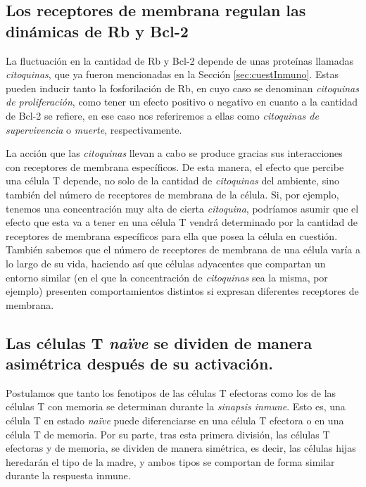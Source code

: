 \subsection{Los receptores de membrana regulan las dinámicas de Rb y Bcl-2}
\label{sub:hip_recep}

La fluctuación en la cantidad de Rb y Bcl-2 depende de unas proteínas llamadas \textit{citoquinas}, que ya fueron mencionadas en la Sección \ref{sec:cuestInmuno}. Estas pueden inducir tanto la fosforilación de Rb, en cuyo caso se denominan \textit{citoquinas de proliferación}, como tener un efecto positivo o negativo en cuanto a la cantidad de Bcl-2 se refiere, en ese caso nos referiremos a ellas como \textit{citoquinas de supervivencia} o \textit{muerte}, respectivamente.

La acción que las \textit{citoquinas} llevan a cabo se produce gracias sus interacciones con receptores de membrana específicos. De esta manera, el efecto que percibe una célula T depende, no solo de la cantidad de \textit{citoquinas} del ambiente, sino también del número de receptores de membrana de la célula. Si, por ejemplo, tenemos una concentración muy alta de cierta \textit{citoquina}, podríamos asumir que el efecto que esta va a tener en una célula T vendrá determinado por la cantidad de receptores de membrana específicos para ella que posea la célula en cuestión. También sabemos que el número de receptores de membrana de una célula varía a lo largo de su vida, haciendo así que células adyacentes que compartan un entorno similar (en el que la concentración de \textit{citoquinas} sea la misma, por ejemplo) presenten comportamientos distintos si expresan diferentes receptores de membrana.

\subsection{Las células T \textit{naïve} se dividen de manera asimétrica después de su activación.}
\label{sub:hip_divAsim}

Postulamos que tanto los fenotipos de las células T efectoras como los de las células T con memoria se determinan durante la \textit{sinapsis inmune}. Esto es, una célula T en estado \textit{naïve} puede diferenciarse en una célula T efectora o en una célula T de memoria. Por su parte, tras esta primera división, las células T efectoras y de memoria, se dividen de manera simétrica, es decir, las células hijas heredarán el tipo de la madre, y ambos tipos se comportan de forma similar durante la respuesta inmune.

